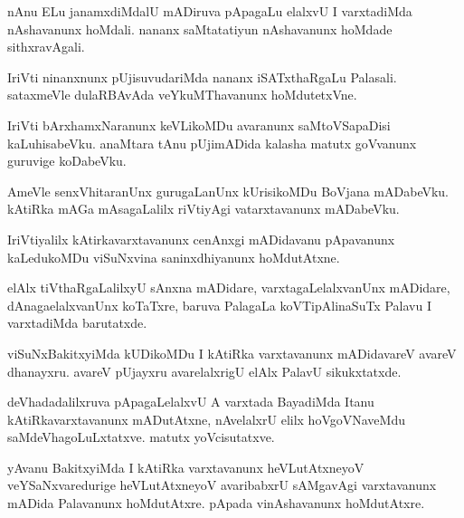 \documentclass{article}
\begin{document}
\begin{mn}%
nAnu ELu janamxdiMdalU mADiruva pApagaLu elalxvU I varxtadiMda nAshavanunx hoMdali. nananx 
saMtatatiyun nAshavanunx hoMdade sithxravAgali.
\end{mn}

\begin{mn}%
IriVti ninanxnunx pUjisuvudariMda nananx iSATxthaRgaLu Palasali. sataxmeVle dulaRBAvAda 
veYkuMThavanunx hoMdutetxVne.
\end{mn}

\begin{mn}%
IriVti bArxhamxNaranunx keVLikoMDu avaranunx saMtoVSapaDisi kaLuhisabeVku. anaMtara tAnu pUjimADida 
kalasha matutx goVvanunx guruvige koDabeVku.
\end{mn}

\begin{mn}%
AmeVle senxVhitaranUnx gurugaLanUnx kUrisikoMDu BoVjana mADabeVku. kAtiRka mAGa mAsagaLalilx 
riVtiyAgi vatarxtavanunx mADabeVku.
\end{mn}

\begin{mn}%
IriVtiyalilx kAtirkavarxtavanunx cenAnxgi mADidavanu pApavanunx kaLedukoMDu viSuNxvina 
saninxdhiyanunx hoMdutAtxne.
\end{mn}

\begin{mn}%
elAlx tiVthaRgaLalilxyU sAnxna mADidare, varxtagaLelalxvanUnx mADidare, dAnagaelalxvanUnx koTaTxre, 
baruva PalagaLa koVTipAlinaSuTx Palavu I varxtadiMda barutatxde.
\end{mn}

\begin{mn}%
viSuNxBakitxyiMda kUDikoMDu I kAtiRka varxtavanunx mADidavareV avareV dhanayxru. avareV pUjayxru 
avarelalxrigU elAlx PalavU sikukxtatxde.
\end{mn}

\begin{mn}%
deVhadadalilxruva pApagaLelalxvU A varxtada BayadiMda Itanu kAtiRkavarxtavanunx mADutAtxne, 
nAvelalxrU elilx hoVgoVNaveMdu saMdeVhagoLuLxtatxve. matutx yoVcisutatxve.
\end{mn}

\begin{mn}%
yAvanu BakitxyiMda I kAtiRka varxtavanunx heVLutAtxneyoV veYSaNxvaredurige heVLutAtxneyoV 
avaribabxrU sAMgavAgi varxtavanunx mADida Palavanunx hoMdutAtxre. pApada vinAshavanunx hoMdutAtxre.
\end{mn}
\end{document}
